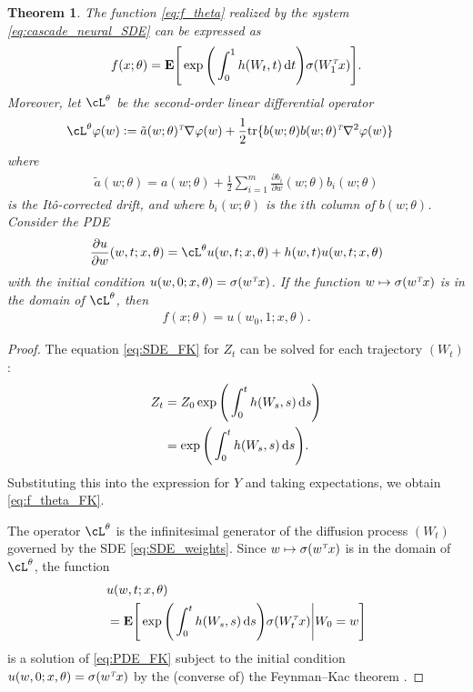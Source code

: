 \documentclass[letterpaper, 10pt, conference]{ieeeconf}
\def\Ex{{\mathbf E}} %
\def\trn{{\hbox{\it\tiny T}}} %
\def\deq{:=}
\newtheorem{theorem}{Theorem}
\begin{document}
\begin{theorem}\label{thm:neural_SDE} The function \eqref{eq:f_theta} realized by the system \eqref{eq:cascade_neural_SDE} can be expressed as
	\begin{align}\label{eq:f_theta_FK}
		f(x;\theta) = \Ex\Bigg[\exp\Bigg(\int^1_0 h(W_t,t)\dif t\Bigg)\sigma(W^\trn_1 x)\Bigg].
	\end{align}
Moreover, let $\cL^\theta$ be the second-order linear differential operator
	\begin{align*}
		&\cL^\theta \varphi(w) \deq \tilde{a}(w;\theta)^\trn \nabla \varphi(w) + \frac{1}{2}{\rm tr} \{ b(w;\theta)b(w;\theta)^\trn \nabla^2 \varphi(w)\}
	\end{align*}
	where
	\begin{align*}
		\tilde{a}(w;\theta) = a(w;\theta) + \frac{1}{2}\sum^m_{i=1} \frac{\partial b_i}{\partial w}(w; \theta) b_i(w; \theta)
	\end{align*}
	is the It\^o-corrected drift, and where $b_i(w;\theta)$ is the $i$th column of $b(w;\theta)$. Consider the PDE
	\begin{align}\label{eq:PDE_FK}
		\frac{\partial u}{\partial w}(w,t;x,\theta) = \cL^\theta u(w,t;x,\theta) + h(w,t)u(w,t;x,\theta)
	\end{align}
with the initial condition $u(w,0; x,\theta) = \sigma(w^\trn x)$. If the function $w \mapsto \sigma(w^\trn x)$ is in the domain of $\cL^\theta$, then 
\begin{align*}
	f(x;\theta) = u(w_0,1; x,\theta).
\end{align*}
\end{theorem}
\begin{proof} The equation \eqref{eq:SDE_FK} for $Z_t$ can be solved for each trajectory $(W_t)$:
	\begin{align*}
		Z_t &= Z_0 \exp\Bigg(\int^t_0 h(W_s,s)\dif s \Bigg) \nonumber\\
		&= \exp\Bigg(\int^t_0 h(W_s,s)\dif s \Bigg).
	\end{align*}
	Substituting this into the expression for $Y$ and taking expectations, we obtain \eqref{eq:f_theta_FK}.
	
	The operator $\cL^\theta$ is the infinitesimal generator of the diffusion process $(W_t)$ governed by the SDE \eqref{eq:SDE_weights}. Since $w \mapsto \sigma(w^\trn x)$ is in the domain of $\cL^\theta$, the function
	\begin{align*}
		& u(w,t;x,\theta) \nonumber\\
		&= \Ex\Bigg[\exp\Bigg(\int^t_0 h(W_s,s)\dif s\Bigg)\sigma(W^\trn_tx)\Bigg|W_0 = w\Bigg]
	\end{align*}
	is a solution of \eqref{eq:PDE_FK} subject to the initial condition $u(w,0;x, \theta) = \sigma(w^\trn x)$ by the (converse of) the Feynman--Kac theorem \cite[Thm.~21.1]{Kallenberg_probability}.
\end{proof}
\end{document}
